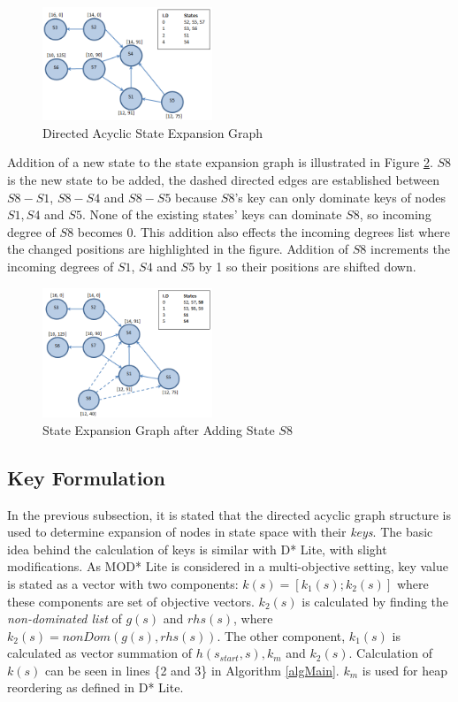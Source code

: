 \documentclass[10pt,journal]{IEEEtran}
\begin{document}
\begin{figure}
\centering
\includegraphics[width=2.0in]{modstarlite/graph1v2}
\caption{Directed Acyclic State Expansion Graph}
\label{fig:graph1}
\end{figure}

Addition of a new state to the state expansion graph is illustrated in Figure \ref{fig:graph2}.  $S8$ is  the new state to be added, the dashed directed edges are established between $S8-S1$, $S8-S4$ and $S8-S5$ because $S8$'s key can only dominate keys of nodes $S1, S4$ and $S5$. None of the existing states' keys can dominate $S8$, so incoming degree of $S8$ becomes 0. This addition also effects the incoming degrees list where the changed positions are highlighted in the figure. Addition of $S8$ increments the incoming degrees of $S1$, $S4$ and $S5$ by 1 so their positions are shifted down.

\begin{figure}
\centering
\includegraphics[width=2.0in]{modstarlite/graph2v2}
\caption{State Expansion Graph after Adding State $S8$}
\label{fig:graph2}
\end{figure}

\subsection{Key Formulation}
In the previous subsection, it is stated that the directed acyclic graph structure is used to determine expansion of nodes in state space with their \textit{keys}. The basic idea behind the calculation of keys is similar with D* Lite, with slight modifications. As MOD* Lite is considered in a multi-objective setting, key value is stated as a vector with two components: $k(s) = [k_{1}(s);k_{2}(s)]$ where these components are set of objective vectors. $k_{2}(s)$ is calculated by finding the \textit{non-dominated list} of $g(s)$ and $rhs(s)$, where $k_{2}(s)= nonDom(g(s), rhs(s))$. The other component, $k_{1}(s)$  is calculated as vector summation of $h(s_{start}, s), k_{m}$ and $k_{2}(s)$. Calculation of $k(s)$ can be seen in lines \{2 and 3\} in Algorithm \ref{algMain}. $k_{m}$ is used for heap reordering as defined in  D* Lite.
\end{document}
